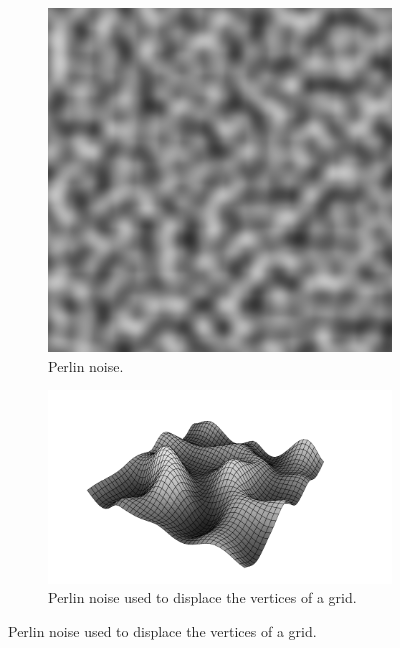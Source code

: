 \documentclass{report}
\begin{document}
\begin{figure}[h!]
	\centering
	\begin{subfigure}[h]{0.35\textwidth}
		\includegraphics[width=\textwidth]{img/perlin_noise.png}
		\caption{Perlin noise.}
		\label{fig:pnoise}
	\end{subfigure}
	\hfill
	\begin{subfigure}[h]{0.55\textwidth}
		\includegraphics[width=\textwidth]{img/perlin_terrain.png}
		\caption{Perlin noise used to displace the vertices of a grid.}
		\label{fig:pterrain}
	\end{subfigure}
\end{figure}
\end{document}
